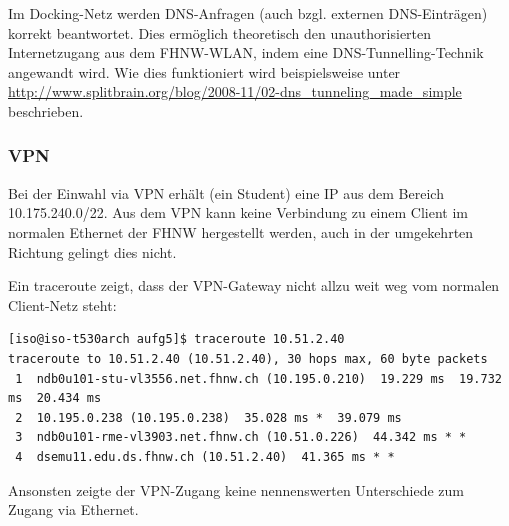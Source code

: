 \documentclass[a4paper,11pt]{scrartcl}
\begin{document}
Im Docking-Netz werden DNS-Anfragen (auch bzgl. externen DNS-Einträgen) korrekt beantwortet. Dies ermöglich theoretisch den unauthorisierten Internetzugang aus dem FHNW-WLAN, indem eine DNS-Tunnelling-Technik angewandt wird. Wie dies funktioniert wird beispielsweise unter \url{http://www.splitbrain.org/blog/2008-11/02-dns_tunneling_made_simple} beschrieben.

\subsubsection{VPN}
Bei der Einwahl via VPN erhält (ein Student) eine IP aus dem Bereich 10.175.240.0/22. Aus dem VPN kann keine Verbindung zu einem Client im normalen Ethernet der FHNW hergestellt werden, auch in der umgekehrten Richtung gelingt dies nicht.

Ein traceroute zeigt, dass der VPN-Gateway nicht allzu weit weg vom normalen Client-Netz steht:
\begin{lstlisting}
[iso@iso-t530arch aufg5]$ traceroute 10.51.2.40
traceroute to 10.51.2.40 (10.51.2.40), 30 hops max, 60 byte packets
 1  ndb0u101-stu-vl3556.net.fhnw.ch (10.195.0.210)  19.229 ms  19.732 ms  20.434 ms
 2  10.195.0.238 (10.195.0.238)  35.028 ms *  39.079 ms
 3  ndb0u101-rme-vl3903.net.fhnw.ch (10.51.0.226)  44.342 ms * *
 4  dsemu11.edu.ds.fhnw.ch (10.51.2.40)  41.365 ms * *
\end{lstlisting}
Ansonsten zeigte der VPN-Zugang keine nennenswerten Unterschiede zum Zugang via Ethernet.
\end{document}
